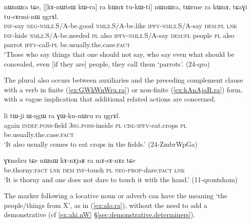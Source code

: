 \begin{exe}
\ex \label{ex:nW.tCaGi}
\gll [kɤ-ti mɤ-kɯ-pe kɯ-fse tu-kɯ-ti] nɯnɯra tɕe, [[kɤ-nɯtsɯ kɯ-ra] ra kɯnɤ tu-kɯ-ti] nɯnɯra, 
tɯrme ra kɯnɤ, tɕaɣi tu-sɤrmi-nɯ ŋgrɤl.  \\
\textsc{inf}-say \textsc{neg}-\textsc{nmlz}.S/A-be.good \textsc{nmlz}.S/A-be.like \textsc{ipfv}-\textsc{nmlz}.S/A-say \textsc{dem}:\textsc{pl} \textsc{lnk} \textsc{inf}-hide \textsc{nmlz}.S/A-be.needed \textsc{pl} also \textsc{ipfv}-\textsc{nmlz}.S/A-say \textsc{dem}:\textsc{pl} people \textsc{pl} also  parrot \textsc{ipfv}-call-\textsc{pl} be.usually.the.case:\textsc{fact} \\
\glt `Those who say things that one should not say, who say even what should be concealed, even [if they are] people, they call them `parrots'. (24-qro)
\end{exe} 

 
The plural  also occurs between auxiliaries and the preceding complement clause with a verb in finite (\ref{ex:GWkWnWru.ra}) or non-finite (\ref{ex:kAnAjaR.ra}) form, with a vague implication that additional related actions are concerned.

\begin{exe}
\ex \label{ex:GWkWnWru.ra}
 \gll li tɯ-ji ɯ-ŋgɯ ra ɣɯ-ku-nɯru ra ŋgrɤl. \\
 again \textsc{indef}.\textsc{poss}-field \textsc{3sg}.\textsc{poss}-inside \textsc{pl} \textsc{cisl}-\textsc{ipfv}-eat.crops \textsc{pl} be.usually.the.case:\textsc{fact} \\
\glt `It also usually comes to eat crops in the fields.' (24-ZmbrWpGa) 
\end{exe}

\begin{exe}
\ex \label{ex:kAnAjaR.ra}
 \gll  ɣɤmdzu tɕe nɯnɯ kɤ-nɤjaʁ ra mɤ-sɤ-nɤz tɕe \\
be.thorny:\textsc{fact} \textsc{lnk} \textsc{dem} \textsc{inf}-touch \textsc{pl} \textsc{neg}-\textsc{prop}-dare:\textsc{fact} \textsc{lnk} \\
\glt `It is thorny and one does not dare to touch it with the hand.' (11-qrontshom) 
\end{exe}

The marker  following a locative noun or adverb can have the meaning `the people/things from X', as in (\ref{ex:alo.ra}), without the need to add a demonstrative (cf \ref{ex:aki.nW} §\ref{sec:demonstrative.determiners}).

